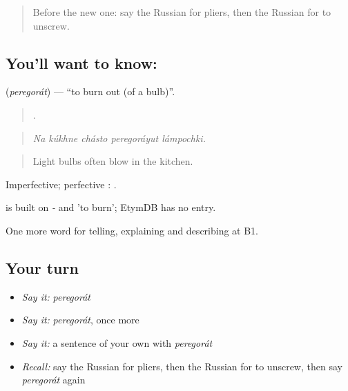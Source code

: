 \label{lesson:RU-C533-peregorat}



\begin{quote}
Before the new one: say the Russian for pliers, then the Russian for to unscrew.
\end{quote}

\subsection*{You'll want to know: }
\textbf{} (\emph{peregorát}) — \textquotedblleft{}to burn out (of a bulb)\textquotedblright{}.

\begin{quote}
    .
\end{quote}

\begin{quote}
\emph{Na kúkhne chásto peregoráyut lámpochki.}
\end{quote}

\begin{quote}
Light bulbs often blow in the kitchen.
\end{quote}

Imperfective; perfective : \emph{ }.

\begin{cousinweb}
\emph{} is built on \emph{-} and \emph{} 'to burn'; EtymDB has no entry.
\end{cousinweb}

\begin{grammarlens}[title={What you've built}]
One more word for telling, explaining and describing at B1.
\end{grammarlens}

\subsection*{Your turn}
\begin{itemize}
\raggedright
  \item \emph{Say it:} \emph{peregorát}
  \item \emph{Say it:} \emph{peregorát}, once more
  \item \emph{Say it:} a sentence of your own with \emph{peregorát}
  \item \emph{Recall:} say the Russian for pliers, then the Russian for to unscrew, then say \emph{peregorát} again
\end{itemize}

